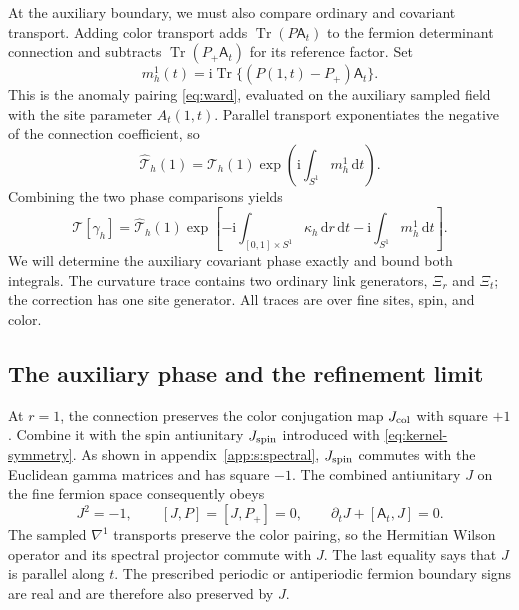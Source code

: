\documentclass[11pt,a4paper]{article}
\theoremstyle{remark}
\DeclareMathOperator{\Tr}{Tr}
\newcommand{\dd}{\mathrm d}
\newcommand{\ii}{\mathrm i}
\begin{document}
At the auxiliary boundary, we must also compare ordinary and covariant
transport. Adding color transport adds $\Tr(P\mathsf A_t)$ to the
fermion determinant connection and subtracts
$\Tr(P_+\mathsf A_t)$ for its reference factor. Set
\begin{equation}
 m_h^1(t)=\ii\Tr\{(P(1,t)-P_+)\mathsf A_t\}.
 \label{eq:auxiliary-color-correction}
\end{equation}
This is the anomaly pairing \eqref{eq:ward}, evaluated on the auxiliary
sampled field with the site parameter $A_t(1,t)$. Parallel transport
exponentiates the negative of the connection coefficient, so
\begin{equation}
 \widehat{\mathcal T}_h(1)=\mathcal T_h(1)
                 \exp\!\left(\ii\int_{S^1}m_h^1\,\dd t\right).
\end{equation}
Combining the two phase comparisons yields
\begin{equation}
 \mathcal T[\gamma_h]=\widehat{\mathcal T}_h(1)
 \exp\!\left[-\ii\int_{[0,1]\times S^1}\kappa_h\,\dd r\,\dd t
              -\ii\int_{S^1}m_h^1\,\dd t\right].
 \label{eq:phase-comparison-ordinary-cylinder}
\end{equation}
We will determine the auxiliary covariant phase exactly and bound both
integrals. The curvature trace contains two ordinary link generators,
$\Xi_r$ and $\Xi_t$; the correction has one site generator.
All traces are over fine sites, spin, and color.

\subsection{The auxiliary phase and the refinement limit}

At $r=1$, the connection preserves the color conjugation map
$J_{\rm col}$ with square $+1$. Combine it with the spin antiunitary
$J_{\rm spin}$ introduced with \eqref{eq:kernel-symmetry}.
As shown in appendix~\ref{app:s:spectral}, $J_{\rm spin}$ commutes
with the Euclidean gamma matrices and has square $-1$. The combined
antiunitary $J$ on the fine fermion space consequently obeys
\begin{equation}
 J^2=-1,\qquad [J,P]=[J,P_+]=0,\qquad
 \partial_tJ+[\mathsf A_t,J]=0 .
\end{equation}
The sampled $\nabla^1$ transports preserve the color pairing, so the
Hermitian Wilson operator and its spectral projector commute with $J$.
The last equality says that $J$ is parallel along $t$. The prescribed
periodic or antiperiodic fermion boundary signs are real and are therefore
also preserved by $J$.
\end{document}
